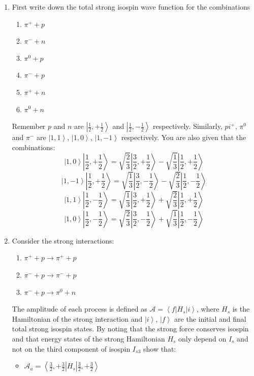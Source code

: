 \begin{enumerate}
\item First write down the total strong isospin wave function for the combinations
\begin{enumerate}[i]
\item $\pi^++p$
\item $\pi^-+n$
\item $\pi^0+p$
\item $\pi^-+p$
\item $\pi^++n$
\item $\pi^0+n$
\end{enumerate}
Remember $p$ and $n$ are $\left|\frac{1}{2},+\frac{1}{2}\right>$ and $\left|\frac{1}{2},-\frac{1}{2}\right>$ respectively. Similarly, $pi^+$, $\pi^0$ and $\pi^-$ are $\left|1,1\right>$, $\left|1,0\right>$, $\left|1,-1\right>$ respectively. You are also given that the combinations:
\[
\left|1,0\right>\left|\frac{1}{2},+\frac{1}{2}\right>=\sqrt{\frac{2}{3}}\left|\frac{3}{2},+\frac{1}{2}\right>-\sqrt{\frac{1}{3}}\left|\frac{1}{2},+\frac{1}{2}\right>
\]
\[
\left|1,-1\right>\left|\frac{1}{2},+\frac{1}{2}\right>=\sqrt{\frac{1}{3}}\left|\frac{3}{2},-\frac{1}{2}\right>-\sqrt{\frac{2}{3}}\left|\frac{1}{2},-\frac{1}{2}\right>
\]
\[
\left|1,1\right>\left|\frac{1}{2},-\frac{1}{2}\right>=\sqrt{\frac{1}{3}}\left|\frac{3}{2},+\frac{1}{2}\right>+\sqrt{\frac{2}{3}}\left|\frac{1}{2},+\frac{1}{2}\right>
\]
\[
\left|1,0\right>\left|\frac{1}{2},-\frac{1}{2}\right>=\sqrt{\frac{2}{3}}\left|\frac{3}{2},-\frac{1}{2}\right>+\sqrt{\frac{1}{3}}\left|\frac{1}{2},-\frac{1}{2}\right>
\]
\item Consider the strong interactions:
\begin{enumerate}[a]
\item $\pi^++p\to\pi^++p$
\item $\pi^-+p\to\pi^-+p$
\item $\pi^-+p\to\pi^0+n$
\end{enumerate}
The amplitude of each process is defined as $\mathcal{A}=\left<f\right|H_s\left|i\right>$, where $H_s$ is the Hamiltonian of the strong interaction and $\left|i\right>$, $\left|f\right>$ are the initial and final total strong isospin states. By noting that the strong force conserves isospin 
and that energy states of the strong Hamiltonian $H_s$ only depend on $I_{s}$ and not on the third component of isospin $I_{s3}$ show that:
\begin{itemize}
\item $\mathcal{A}_a=\left<\frac{3}{2},+\frac{3}{2}\right|H_s\left|\frac{3}{2},+\frac{3}{2}\right>$

\end{itemize}
\end{enumerate}
